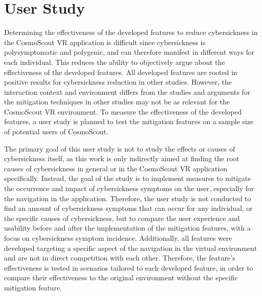 \chapter{User Study}\label{ch:user-study}

Determining the effectiveness of the developed features to reduce cybersickness in the CosmoScout VR application is
difficult since cybersickness is polysymptomatic and polygenic, and can therefore manifest in different ways for each
individual.
This reduces the ability to objectively argue about the effectiveness of the developed features.
All developed features are rooted in positive results for cybersickness reduction in other studies.
However, the interaction context and environment differs from the studies and arguments for the mitigation techniques
in other studies may not be as relevant for the CosmoScout VR environment.
To measure the effectiveness of the developed features, a user study is planned to test the mitigation features on a
sample size of potential users of CosmoScout.

The primary goal of this user study is not to study the effects or causes of cybersickness itself, as this work is
only indirectly aimed at finding the root causes of cybersickness in general or in the CosmoScout VR application
specifically.
Instead, the goal of the study is to implement measures to mitigate the occurrence and impact of cybersickness
symptoms on the user, especially for the navigation in the application.
Therefore, the user study is not conducted to find an amount of cybersickness symptoms that can occur for any
individual, or the specific causes of cybersickness, but to compare the user experience and usability before and
after the implementation of the mitigation features, with a focus on cybersickness symptom incidence.
Additionally, all features were developed targeting a specific aspect of the navigation in the virtual environment
and are not in direct competition with each other.
Therefore, the feature's effectiveness is tested in scenarios tailored to each developed feature, in order to
compare their effectiveness to the original environment without the specific mitigation feature.

